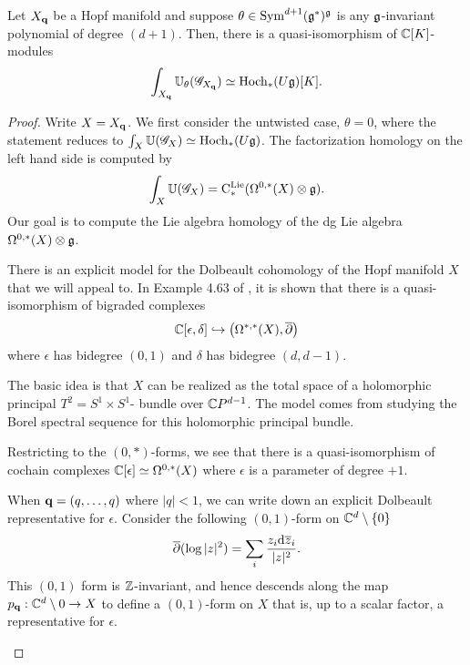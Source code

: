 \begin{prop}
\label{prop: hopf}
Let $X_{\bf q}$ be a Hopf manifold and suppose $\theta \in {\rm Sym}^{d+1}(\mathfrak g^*)^\mathfrak g$ is any $\mathfrak g$-invariant polynomial of degree $(d+1)$. 
Then, there is a quasi-isomorphism of $\mathbb C[K]$-modules
\[
\int_{X_{\bf q}} \mathbb U_\theta (\mathscr G_{X_{\bf q}}) \simeq {\rm Hoch}_*(U \mathfrak g)[K] .
\]
\end{prop}
\begin{proof}
Write $X = X_{\bf q}$. 
We first consider the untwisted case, $\theta = 0$, where the statement reduces to $\int_X \mathbb U (\mathscr G_X) \simeq {\rm Hoch}_*(U \mathfrak g)$.
The factorization homology on the left hand side is computed by
\[
\int_X \mathbb U(\mathscr G_X) = {\rm C}^{\rm Lie}_*(\Omega^{0,*}(X) \otimes \mathfrak g) .
\]
Our goal is to compute the Lie algebra homology of the dg Lie algebra $\Omega^{0,*}(X) \otimes \mathfrak g$.  

There is an explicit model for the Dolbeault cohomology of the Hopf manifold $X$ that we will appeal to. 
In Example 4.63 of \cite{Tanre}, it is shown that there is a quasi-isomorphism of bigraded complexes
\[
\mathbb C[\epsilon,\delta] \hookrightarrow \left(\Omega^{*,*}(X), \overline{\partial}\right)
\]
where $\epsilon$ has bidegree $(0,1)$ and $\delta$ has bidegree $(d,d-1)$. 

\begin{rmk}
The basic idea is that $X$ can be realized as the total space of a holomorphic principal $T^2 = S^1 \times S^1$- bundle over $\mathbb C P^{d-1}$. 
The model comes from studying the Borel spectral sequence for this holomorphic principal bundle.
\end{rmk}

Restricting to the $(0,*)$-forms, we see that there is a quasi-isomorphism of cochain complexes $\mathbb C[\epsilon] \simeq \Omega^{0,*}(X)$ where $\epsilon$ is a parameter of degree $+1$. 

\begin{eg}
When ${\bf q} = (q,\ldots,q)$ where $|q| < 1$, we can write down an explicit Dolbeault representative for $\epsilon$. 
Consider the following $(0,1)$-form on $\mathbb C^d \setminus \{0\}$
\[
\overline{\partial} (\log |z|^2) = \sum_i \frac{z_i{\rm d} \overline{z}_i}{|z|^2} .
\]
This $(0,1)$ form is $\mathbb Z$-invariant, and hence descends along the map $p_{\bf q} : \mathbb C^d \setminus 0 \to X$ to define a $(0,1)$-form on $X$ that is, up to a scalar factor, a representative for $\epsilon$. 
\end{eg}


\end{proof}
